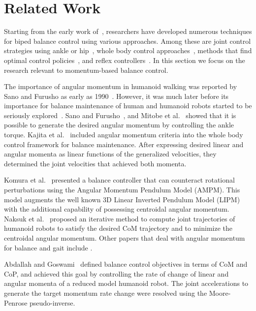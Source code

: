 \documentclass{llncs}
\begin{document}
\section{Related Work}


Starting from the early work of~\cite{Vuko69}, researchers have
developed numerous techniques for biped balance control
using various approaches.
Among these are joint control strategies using ankle or hip~\cite{Sano90,Stephens07},
whole body control approaches~\cite{Kagami00,Sugihara02,KKKFHYH03,Choi07,Park05,Stephens10},
methods that find optimal control policies~\cite{Zhou03,Muico09},
and reflex controllers~\cite{Huang05}.
In this section we focus on the research relevant
to momentum-based balance control.

The importance of angular momentum in humanoid walking was reported by Sano and
Furusho as early as 1990~\cite{Sano90}. However, it was much later before its
importance for balance maintenance
of human and humanoid robots started to be seriously explored~\cite{KKKFHYH03,Goswami04,PHH04}.
Sano and Furusho~\cite{Sano90}, and Mitobe et al.~\cite{Mitobe04}
showed that it is possible to generate the desired angular momentum
by controlling the ankle torque.
Kajita et al.~\cite{KKKFHYH03} included angular momentum criteria into the
whole body control framework for balance maintenance.
After expressing desired linear and angular momenta as linear functions of the
generalized velocities, they determined the joint velocities
that achieved both momenta.

Komura et al.~\cite{KLKK05} presented a balance controller that can counteract
rotational perturbations using the Angular Momentum Pendulum Model (AMPM).
This model augments the well known 3D Linear
Inverted Pendulum Model (LIPM)~\cite{KKKYH01} with the additional capability of possessing
centroidal angular momentum.
Naksuk et al.~\cite{Naksuk04} proposed an iterative method
to compute joint trajectories of humanoid robots to satisfy the desired CoM trajectory
and to minimize the centroidal angular momentum.
Other papers that deal with angular momentum for balance
and gait include \cite{Sian03,Ahn06,Ugurlu10,Ye10,Lasa10}.

Abdallah and Goswami~\cite{AG05} defined balance control objectives
in terms of CoM and CoP, and achieved this goal by controlling
the rate of change of linear and angular momenta of a reduced model
humanoid robot. The joint accelerations to generate the target
momentum rate change were resolved using the Moore-Penrose pseudo-inverse.
\end{document}
